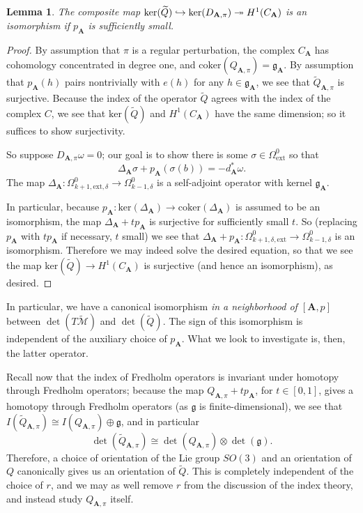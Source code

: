\documentclass[10pt,a4paper]{amsart}
\newtheorem{lemma}[theorem]{Lemma}
\theoremstyle{definition}
\theoremstyle{remark}
\numberwithin{figure}{qchap}
\begin{document}
\begin{lemma}The composite map $\textup{ker}(\widetilde Q) \hookrightarrow \textup{ker}(D_{\mathbf{A},\pi}) \twoheadrightarrow H^1(C_{\mathbf{A}})$ is an isomorphism if $p_{\mathbf{A}}$ is sufficiently small.
\end{lemma}
\begin{proof}By assumption that $\pi$ is a regular perturbation, the complex $C_{\mathbf{A}}$ has cohomology concentrated in degree one, and $\text{coker}(Q_{\mathbf{A},\pi}) = \mathfrak g_{\mathbf{A}}$. By assumption that $p_{\mathbf{A}}(h)$ pairs nontrivially with $e(h)$ for any $h \in \mathfrak g_{\mathbf{A}}$, we see that $\widetilde Q_{\mathbf{A},\pi}$ is surjective. Because the index of the operator $\widetilde Q$ agrees with the index of the complex $C$, we see that $\text{ker}(\widetilde Q)$ and $H^1(C_{\mathbf{A}})$ have the same dimension; so it suffices to show surjectivity.

So suppose $D_{\mathbf{A},\pi} \omega = 0$; our goal is to show there is some $\sigma \in \Omega^0_{\text{ext}}$ so that 
$$\Delta_{\mathbf A} \sigma + p_{\mathbf{A}}(\sigma(b)) = - d_{\mathbf A}^*\omega.$$ 
The map $\Delta_{\mathbf{A}}: \Omega^0_{k+1,\text{ext},\delta} \to \Omega^0_{k-1,\delta}$ is a self-adjoint operator with kernel $\mathfrak g_{\mathbf{A}}$.

In particular, because $p_{\mathbf{A}}: \text{ker}(\Delta_{\mathbf{A}}) \to \text{coker}(\Delta_{\mathbf{A}})$ is assumed to be an isomorphism, the map $\Delta_{\mathbf{A}} + tp_{\mathbf{A}}$ is surjective for sufficiently small $t$. So (replacing $p_{\mathbf{A}}$ with $tp_{\mathbf{A}}$ if necessary, $t$ small) we see that $\Delta_{\mathbf{A}} + p_{\mathbf{A}}: \Omega^0_{k+1,\delta,\text{ext}} \to \Omega^0_{k-1,\delta}$ is an isomorphism. Therefore we may indeed solve the desired equation, so that we see the map $\text{ker}(\widetilde Q) \to H^1(C_{\mathbf{A}})$ is surjective (and hence an isomorphism), as desired.
\end{proof}

In particular, we have a canonical isomorphism \emph{in a neighborhood of $[\mathbf{A},p]$} between $\det(T\widetilde{\mathcal M})$ and $\det(\widetilde Q)$. The sign of this isomorphism is independent of the auxiliary choice of $p_{\mathbf{A}}$. What we look to investigate is, then, the latter operator.

Recall now that the index of Fredholm operators is invariant under homotopy through Fredholm operators; because the map $Q_{\mathbf{A},\pi} + tp_{\mathbf{A}}$, for $t \in [0,1]$, gives a homotopy through Fredholm operators (as $\mathfrak g$ is finite-dimensional), we see that $I(\widetilde{Q}_{\mathbf{A},\pi}) \cong I(Q_{\mathbf{A},\pi}) \oplus \mathfrak g$, and in particular 
$$\det(\widetilde{Q}_{\mathbf{A},\pi}) \cong \det(Q_{\mathbf{A},\pi}) \otimes \det(\mathfrak g).$$ 
Therefore, a choice of orientation of the Lie group $SO(3)$ and an orientation of $Q$ canonically gives us an orientation of $\widetilde Q$. This is completely independent of the choice of $r$, and we may as well remove $r$ from the discussion of the index theory, and instead study $Q_{\mathbf{A},\pi}$ itself. 
\end{document}
